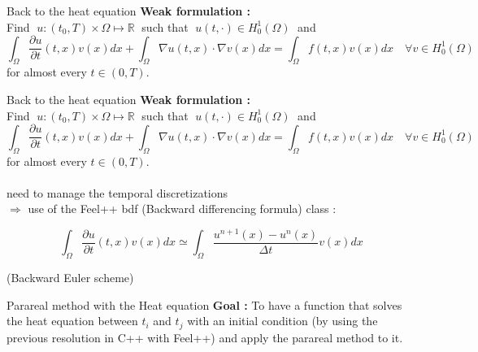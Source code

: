 \begin{frame}{Back to the heat equation}
	\textbf{Weak formulation :} \\
	Find $\; u:(t_0,T)\times\Omega \mapsto \mathbb{R} \;$ such that $\; u(t,\cdot)\in H_0^1(\Omega) \;$ and
	$$\int_\Omega \frac{\partial u}{\partial t}(t,x)v(x)dx+\int_\Omega \nabla u(t,x)\cdot\nabla v(x)dx = \int_\Omega f(t,x)v(x)dx \quad \forall v\in H_0^1(\Omega)$$
	for almost every $t\in(0,T)$. \\
	
	
\end{frame}

\begin{frame}{Back to the heat equation}
	\textbf{Weak formulation :} \\
	Find $\; u:(t_0,T)\times\Omega \mapsto \mathbb{R} \;$ such that $\; u(t,\cdot)\in H_0^1(\Omega) \;$ and
	$$\boxed{\int_\Omega \frac{\partial u}{\partial t}(t,x)v(x)dx}+\int_\Omega \nabla u(t,x)\cdot\nabla v(x)dx = \int_\Omega f(t,x)v(x)dx \quad \forall v\in H_0^1(\Omega)$$
	for almost every $t\in(0,T)$. \\ \; \\
	
	need to manage the temporal discretizations \\
	$\Rightarrow$ use of the Feel++ bdf (Backward differencing formula) class :
	
	$$\int_\Omega \frac{\partial u}{\partial t}(t,x)v(x)dx \simeq \int_\Omega \frac{u^{n+1}(x)-u^n(x)}{\Delta t}v(x)dx$$
	
	(Backward Euler scheme)
\end{frame}

\begin{frame}{Parareal method with the Heat equation}
	\textbf{Goal :} To have a function that solves the heat equation between $t_i$ and $t_j$ with an initial condition (by using the previous resolution in C++ with Feel++) and apply the parareal method to it.
\end{frame}





